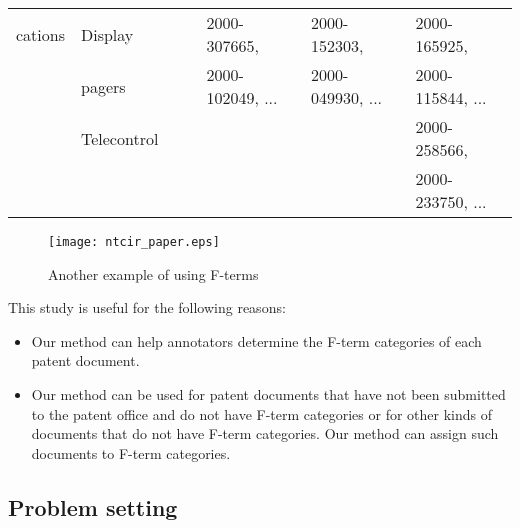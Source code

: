 \documentclass[english]{jnlp_1.2c}
\begin{document}
\begin{table}[t]
\begin{footnotesize}
\begin{center}
\begin{tabular}{|l|l|l|l|l|l|l|}
\multicolumn{1}{|l|}{cations}   & Display         &                             &                                & 2000-307665,         & 2000-152303,          & 2000-165925,          \\
\multicolumn{1}{|l|}{}                  & pagers          &                             &                                & 2000-102049, ...       & 2000-049930, ...        & 2000-115844, ...        \\\cline{2-7}
\multicolumn{1}{|l|}{}                  & Telecontrol &                                 &                                &                              &                                       & 2000-258566,          \\
\multicolumn{1}{|l|}{}                  &                         &                             &                                &                              &                                       & 2000-233750, ...        \\\hline
\end{tabular}
\end{center}
\end{footnotesize}
\end{table}

    \begin{figure}[t]
  \begin{center}
            \texttt{[image: ntcir\_paper.eps]} 
    \caption{Another example of using F-terms}
    \label{fig:lattice}
  \end{center}
    \end{figure}

This study is useful 
for the following reasons:
\begin{itemize}
\item 
Our method can 
help annotators 
determine the F-term categories 
of each patent document.

\item 
Our method can 
be used for patent documents 
that have not been submitted to the patent office 
and do not have 
F-term categories or 
for other kinds of documents
that do not have 
F-term categories.
Our method can assign such documents 
to F-term categories.

\end{itemize}


\subsection{Problem setting}
\label{sec:problem}
\end{document}
